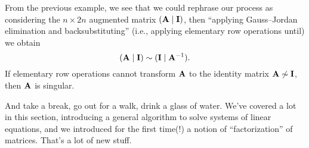 From the previous example, we see that we could rephrase our process as
considering the $n\times 2n$ augmented matrix $(\mathbf{A}\mid\mathbf{I})$,
then ``applying Gauss--Jordan elimination and backsubstituting'' (i.e.,
applying elementary row operations until) we obtain
\begin{equation}
(\mathbf{A}\mid\mathbf{I})\sim(\mathbf{I}\mid\mathbf{A}^{-1}).
\end{equation}
If elementary row operations cannot transform $\mathbf{A}$ to the identity
matrix $\mathbf{A}\not\sim\mathbf{I}$, then $\mathbf{A}$ is singular.



 And take a break, go out for a walk, drink a glass of water.
We've covered a lot in this section, introducing a general algorithm to
solve systems of linear equations, and we introduced for the first
time(!) a notion of ``factorization'' of matrices. That's a lot of new
stuff.